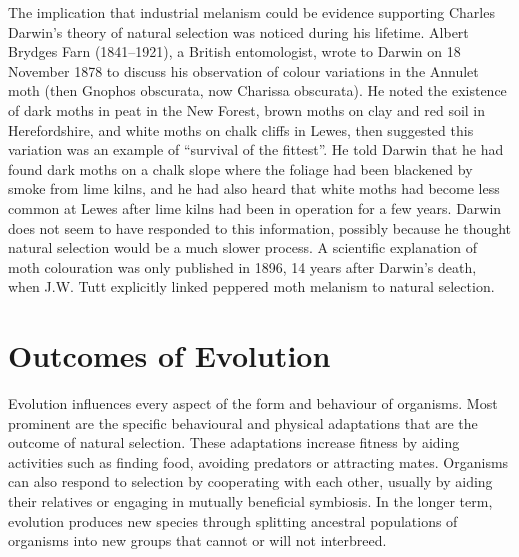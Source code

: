 The implication that industrial melanism could be evidence supporting Charles Darwin's theory of natural selection was noticed during his lifetime. Albert Brydges Farn (1841--1921), a British entomologist, wrote to Darwin on 18 November 1878 to discuss his observation of colour variations in the Annulet moth (then Gnophos obscurata, now Charissa obscurata). He noted the existence of dark moths in peat in the New Forest, brown moths on clay and red soil in Herefordshire, and white moths on chalk cliffs in Lewes, then suggested this variation was an example of ``survival of the fittest''. He told Darwin that he had found dark moths on a chalk slope where the foliage had been blackened by smoke from lime kilns, and he had also heard that white moths had become less common at Lewes after lime kilns had been in operation for a few years. Darwin does not seem to have responded to this information, possibly because he thought natural selection would be a much slower process. A scientific explanation of moth colouration was only published in 1896, 14 years after Darwin's death, when J.W. Tutt explicitly linked peppered moth melanism to natural selection.

\hypertarget{outcomes-of-evolution}{%
\section{Outcomes of Evolution}\label{outcomes-of-evolution}}

Evolution influences every aspect of the form and behaviour of organisms. Most prominent are the specific behavioural and physical adaptations that are the outcome of natural selection. These adaptations increase fitness by aiding activities such as finding food, avoiding predators or attracting mates. Organisms can also respond to selection by cooperating with each other, usually by aiding their relatives or engaging in mutually beneficial symbiosis. In the longer term, evolution produces new species through splitting ancestral populations of organisms into new groups that cannot or will not interbreed.

